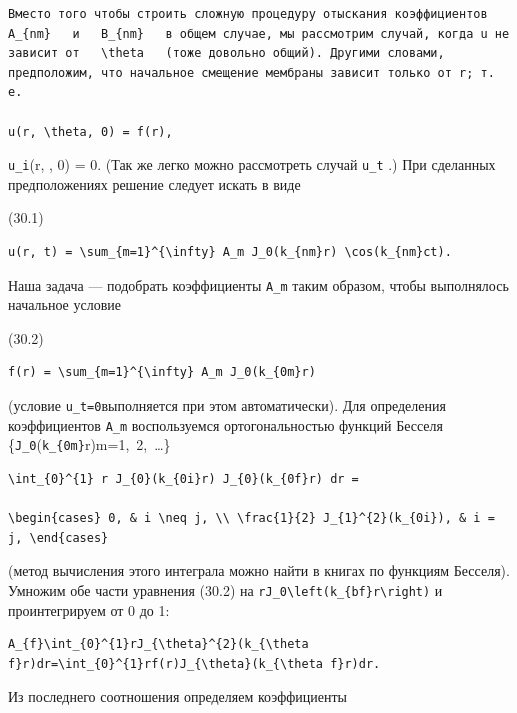 \documentclass[
  ukrainian,
]{article}
\begin{document}
\begin{verbatim}
Вместо того чтобы строить сложную процедуру отыскания коэффициентов   A_{nm}   и   B_{nm}   в общем случае, мы рассмотрим случай, когда u не зависит от   \theta   (тоже довольно общий). Другими словами, предположим, что начальное смещение мембраны зависит только от r; т. е.

u(r, \theta, 0) = f(r),
\end{verbatim}

\texttt{u\_i}(r, \theta, 0) = 0. (Так же легко можно рассмотреть случай
\texttt{u\_t}  .) При сделанных предположениях решение следует
искать в виде

(30.1)

\begin{verbatim}
u(r, t) = \sum_{m=1}^{\infty} A_m J_0(k_{nm}r) \cos(k_{nm}ct).
\end{verbatim}

Наша задача --- подобрать коэффициенты \texttt{A\_m} таким образом,
чтобы выполнялось начальное условие

(30.2)

\begin{verbatim}
f(r) = \sum_{m=1}^{\infty} A_m J_0(k_{0m}r)
\end{verbatim}

(условие \texttt{u\_t=0}выполняется при этом автоматически). Для
определения коэффициентов \texttt{A\_m} воспользуемся ортогональностью
функций Бесселя
\{\texttt{J\_0}(\texttt{k\_\{0m\}}r)\colon m=1,~2,~\dots\}

\begin{verbatim}
\int_{0}^{1} r J_{0}(k_{0i}r) J_{0}(k_{0f}r) dr =

\begin{cases} 0, & i \neq j, \\ \frac{1}{2} J_{1}^{2}(k_{0i}), & i = j, \end{cases}
\end{verbatim}

(метод вычисления этого интеграла можно найти в книгах по функциям
Бесселя). Умножим обе части уравнения (30.2) на
\texttt{rJ\_0\textbackslash{}left(k\_\{bf\}r\textbackslash{}right)} и
проинтегрируем от 0 до 1:

\begin{verbatim}
A_{f}\int_{0}^{1}rJ_{\theta}^{2}(k_{\theta f}r)dr=\int_{0}^{1}rf(r)J_{\theta}(k_{\theta f}r)dr.
\end{verbatim}

Из последнего соотношения определяем коэффициенты
\end{document}
